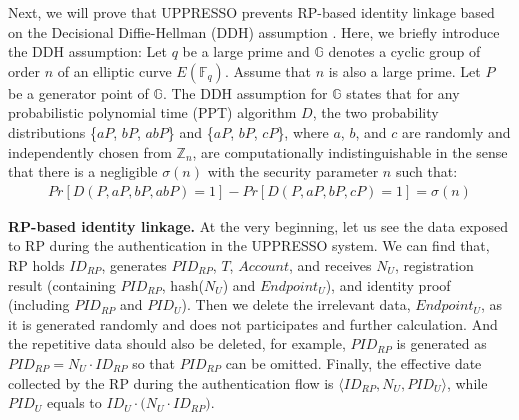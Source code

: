 Next, we will prove that UPPRESSO prevents RP-based identity linkage based on the Decisional Diffie-Hellman (DDH) assumption \cite{GoldwasserK16}. Here, we briefly introduce the DDH assumption:
Let $q$ be a large prime and $\mathbb{G}$ denotes a cyclic group of order $n$ of an elliptic curve $E(\mathbb{F}_q)$.
Assume that $n$ is also a large prime. Let $P$ be a generator point of $\mathbb{G}$. The DDH assumption for $\mathbb{G}$ states that for any probabilistic polynomial time (PPT) algorithm $D$, the two probability distributions \{$aP$, $bP$, $abP$\} and \{$aP$, $bP$, $cP$\}, where $a$, $b$, and $c$ are randomly and independently chosen from $\mathbb{Z}_n$, are computationally indistinguishable in the sense that there is a negligible $\sigma(n)$ with the security parameter $n$ such that:
\vspace{-\topsep}
\begin{multline*}
Pr[D(P, aP, bP, abP)=1]-Pr[D(P, aP, bP, cP)=1]=\sigma(n)
\end{multline*}
\vspace{-\topsep}

\vspace{-2mm}
\noindent\textbf{RP-based identity linkage.}
At the very beginning, let us see the data exposed to RP during the authentication in the UPPRESSO system.
We can find that, RP holds $ID_{RP}$,  generates $PID_{RP}$, $T$, $Account$, and receives $N_U$, registration result (containing $PID_{RP}$, hash($N_U$) and $Endpoint_U$), and identity proof (including $PID_{RP}$ and $PID_U$). Then we delete the irrelevant data, $Endpoint_U$, as it is generated randomly and does not participates and further calculation. And the repetitive data should also be deleted, for example, $PID_{RP}$ is generated as $PID_{RP}=N_U \cdot {ID_{RP}}$ so that $PID_{RP}$ can be omitted. Finally, the effective date collected by the RP during the authentication flow is $\langle ID_{RP}, N_U, PID_U\rangle$, while $PID_U$ equals to $ID_U \cdot{(N_U \cdot {ID_{RP})}}$.

